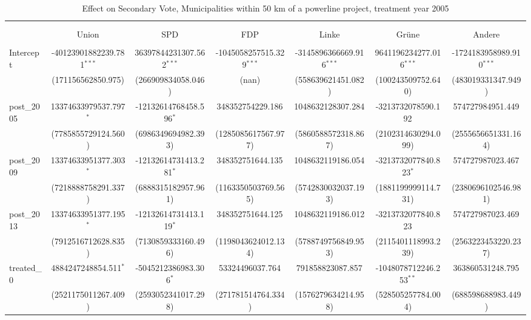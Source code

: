 \begin{table}[!htbp] \centering
  \caption{Effect on Secondary Vote, Municipalities within 50 km of a powerline project, treatment year 2005}
\begin{tabular}{@{\extracolsep{5pt}}lcccccc}
\\[-1.8ex]\hline
\hline \\[-1.8ex]
\\[-1.8ex] & \multicolumn{1}{c}{Union} & \multicolumn{1}{c}{SPD} & \multicolumn{1}{c}{FDP} & \multicolumn{1}{c}{Linke} & \multicolumn{1}{c}{Grüne} & \multicolumn{1}{c}{Andere}  \\
\hline \\[-1.8ex]
 Intercept & -40123901882239.781$^{***}$ & 36397844231307.562$^{***}$ & -1045058257515.329$^{***}$ & -3145896366669.916$^{***}$ & 9641196234277.016$^{***}$ & -1724183958989.910$^{***}$ \\
  & (171156562850.975) & (266909834058.046) & (nan) & (558639621451.082) & (100243509752.640) & (483019331347.949) \\
 post_2005 & 13374633979537.797$^{*}$ & -12132614768458.596$^{*}$ & 348352754229.186$^{}$ & 1048632128307.284$^{}$ & -3213732078590.192$^{}$ & 574727984951.449$^{}$ \\
  & (7785855729124.560) & (6986349694982.393) & (1285085617567.977) & (5860588572318.867) & (2102314630294.099) & (2555656651331.164) \\
 post_2009 & 13374633951377.303$^{*}$ & -12132614731413.281$^{*}$ & 348352751644.135$^{}$ & 1048632119186.054$^{}$ & -3213732077840.823$^{*}$ & 574727987023.467$^{}$ \\
  & (7218888758291.337) & (6888315182957.961) & (1163350503769.565) & (5742830032037.193) & (1881199999114.731) & (2380696102546.981) \\
 post_2013 & 13374633951377.195$^{*}$ & -12132614731413.119$^{*}$ & 348352751644.125$^{}$ & 1048632119186.012$^{}$ & -3213732077840.823$^{}$ & 574727987023.469$^{}$ \\
  & (7912516712628.835) & (7130859333160.496) & (1198043624012.134) & (5788749756849.953) & (2115401118993.239) & (2563223453220.237) \\
 treated_0 & 4884247248854.511$^{*}$ & -5045212386983.306$^{*}$ & 53324496037.764$^{}$ & 791858823087.857$^{}$ & -1048078712246.253$^{**}$ & 363860531248.795$^{}$ \\
  & (2521175011267.409) & (2593052341017.298) & (271781514764.334) & (1576279634214.958) & (528505257784.004) & (688598688983.449) \\

\end{tabular}
\end{table}
